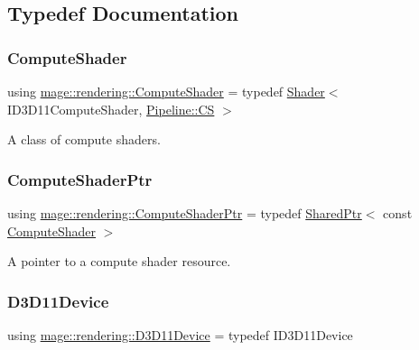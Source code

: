 \subsection{Typedef Documentation}
\mbox{\label{namespacemage_1_1rendering_aa67e55ba4dca44d39b0367b31f091863}} 
\subsubsection{\texorpdfstring{Compute\+Shader}{ComputeShader}}
{\footnotesize\ttfamily using \mbox{\hyperlink{namespacemage_1_1rendering_aa67e55ba4dca44d39b0367b31f091863}{mage\+::rendering\+::\+Compute\+Shader}} = typedef \mbox{\hyperlink{classmage_1_1rendering_1_1_shader}{Shader}}$<$ I\+D3\+D11\+Compute\+Shader, \mbox{\hyperlink{structmage_1_1rendering_1_1_pipeline_1_1_c_s}{Pipeline\+::\+CS}} $>$}

A class of compute shaders. \mbox{\label{namespacemage_1_1rendering_ab3dc9f2114f2e9255b91d9c051da52ea}} 
\subsubsection{\texorpdfstring{Compute\+Shader\+Ptr}{ComputeShaderPtr}}
{\footnotesize\ttfamily using \mbox{\hyperlink{namespacemage_1_1rendering_ab3dc9f2114f2e9255b91d9c051da52ea}{mage\+::rendering\+::\+Compute\+Shader\+Ptr}} = typedef \mbox{\hyperlink{namespacemage_a1e01ae66713838a7a67d30e44c67703e}{Shared\+Ptr}}$<$ const \mbox{\hyperlink{namespacemage_1_1rendering_aa67e55ba4dca44d39b0367b31f091863}{Compute\+Shader}} $>$}

A pointer to a compute shader resource. \mbox{\label{namespacemage_1_1rendering_a7081b2c6e923fac0d42ff4862dc4a823}} 
\subsubsection{\texorpdfstring{D3\+D11\+Device}{D3D11Device}}
{\footnotesize\ttfamily using \mbox{\hyperlink{namespacemage_1_1rendering_a7081b2c6e923fac0d42ff4862dc4a823}{mage\+::rendering\+::\+D3\+D11\+Device}} = typedef I\+D3\+D11\+Device}

